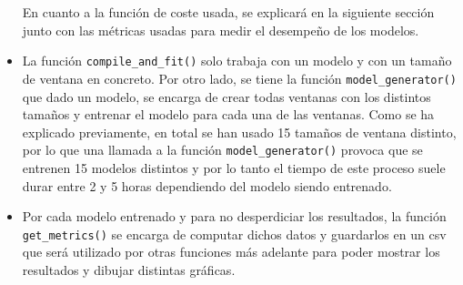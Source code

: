 \begin{itemize}
    En cuanto a la función de coste usada, se explicará en la siguiente sección junto con las métricas usadas para medir el desempeño de los modelos.
    \newline
    
    
     \item La función \small{\verb|compile_and_fit()|} solo trabaja con un modelo y con un tamaño de ventana en concreto. Por otro lado, se tiene la función \small{\verb|model_generator()|} que dado un modelo, se encarga de crear todas ventanas con los distintos tamaños y entrenar el modelo para cada una de las ventanas. Como se ha explicado previamente, en total se han usado 15 tamaños de ventana distinto, por lo que una llamada a la función \small{\verb|model_generator()|} provoca que se entrenen 15 modelos distintos y por lo tanto el tiempo de este proceso suele durar entre 2 y 5 horas dependiendo del modelo siendo entrenado.
    \newline
    
    \item Por cada modelo entrenado y para no desperdiciar los resultados, la función \small{\verb|get_metrics()|} se encarga de computar dichos datos y guardarlos en un \acrshort{csv} que será utilizado por otras funciones más adelante para poder mostrar los resultados y dibujar distintas gráficas.
\end{itemize}


